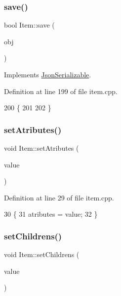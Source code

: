 \subsubsection{\texorpdfstring{save()}{save()}}
{\footnotesize\ttfamily bool Item\+::save (\begin{DoxyParamCaption}\item[{Q\+Json\+Object}]{obj }\end{DoxyParamCaption})\hspace{0.3cm}{\ttfamily [virtual]}}



Implements \hyperlink{class_json_serializable_a98939816a5704c8d4c46f8571a5ae214}{Json\+Serializable}.



Definition at line 199 of file item.\+cpp.


\begin{DoxyCode}
200 \{
201 
202 \}
\end{DoxyCode}
\mbox{\label{class_item_a7ab11dc5bc3eac9b3acdea2ec58bcd63}} 
\subsubsection{\texorpdfstring{set\+Atributes()}{setAtributes()}}
{\footnotesize\ttfamily void Item\+::set\+Atributes (\begin{DoxyParamCaption}\item[{const Q\+List$<$ \hyperlink{class_item_attribute}{Item\+Attribute} $\ast$$>$ \&}]{value }\end{DoxyParamCaption})}



Definition at line 29 of file item.\+cpp.


\begin{DoxyCode}
30 \{
31     atributes = value;
32 \}
\end{DoxyCode}
\mbox{\label{class_item_af6cc06c1af86eba7addaa1abf7034813}} 
\subsubsection{\texorpdfstring{set\+Childrens()}{setChildrens()}}
{\footnotesize\ttfamily void Item\+::set\+Childrens (\begin{DoxyParamCaption}\item[{const Q\+List$<$ \hyperlink{class_item}{Item} $\ast$$>$ \&}]{value }\end{DoxyParamCaption})}



